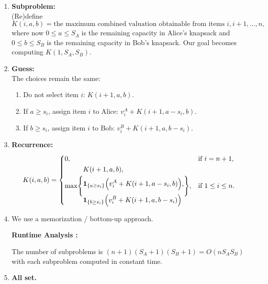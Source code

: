\documentclass[11pt]{article}
\begin{document}
    \begin{enumerate}
        \item \textbf{Subproblem:}\\
        (Re)define 
        \[
        K(i,a,b)= \text{the maximum combined valuation obtainable from items } i,i+1,\dots,n,
        \]
        where now \(0\le a\le S_A\) is the remaining capacity in Alice's knapsack and \(0\le b\le S_B\) is the remaining capacity in Bob's knapsack. Our goal becomes computing \(K(1,S_A,S_B)\).
    
        \item \textbf{Guess:}\\
        The choices remain the same:
        \begin{enumerate}
            \item Do not select item \(i\): \(K(i+1,a,b)\).
            \item If \(a\ge s_i\), assign item \(i\) to Alice: \(v_i^A+K(i+1,a-s_i,b)\).
            \item If \(b\ge s_i\), assign item \(i\) to Bob: \(v_i^B+K(i+1,a,b-s_i)\).
        \end{enumerate}
    
        \item \textbf{Recurrence:}\\[1mm]
        \[
        K(i,a,b)=
        \begin{cases}
        0, & \text{if } i=n+1,\\[1mm]
        \max\Biggl\{
        \begin{aligned}
        & K(i+1,a,b),\\[1mm]
        & \mathbf{1}_{\{a\ge s_i\}}\Bigl(v_i^A+K(i+1,a-s_i,b)\Bigr),\\[1mm]
        & \mathbf{1}_{\{b\ge s_i\}}\Bigl(v_i^B+K(i+1,a,b-s_i)\Bigr)
        \end{aligned}
        \Biggr\}, & \text{if } 1\le i\le n.
        \end{cases}
        \]
    
        \item We use a memorization / bottom-up approach. 
        
            \textbf{Runtime Analysis :}
            
            The number of subproblems is \((n+1)(S_A+1)(S_B+1)=O(nS_A S_B)\) with each subproblem computed in constant time.
        
        \item \textbf{All set.}
    \end{enumerate}
    \newpage
\end{document}
